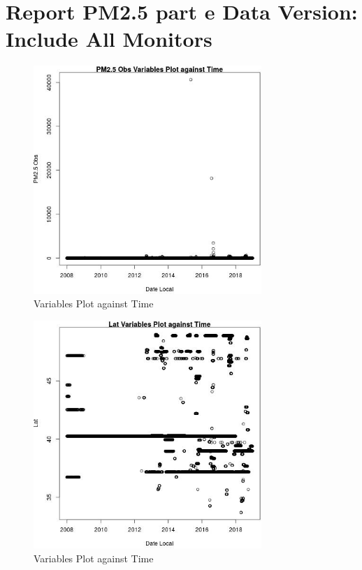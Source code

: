 
\section{Report PM2.5 part e Data Version: Include All Monitors} 
 

\begin{figure} 
\centering  
\includegraphics[width=0.77\textwidth]{Code_Outputs/Report_PM25_Step4_part_e_de_duplicated_aves_ML_input_PM25_ObsvDate_Local.jpg} 
\caption{\label{fig:Report_PM25_Step4_part_e_de_duplicated_aves_ML_inputPM25_ObsvDate_Local}Variables Plot against Time} 
\end{figure} 
 

\begin{figure} 
\centering  
\includegraphics[width=0.77\textwidth]{Code_Outputs/Report_PM25_Step4_part_e_de_duplicated_aves_ML_input_LatvDate_Local.jpg} 
\caption{\label{fig:Report_PM25_Step4_part_e_de_duplicated_aves_ML_inputLatvDate_Local}Variables Plot against Time} 
\end{figure} 
 

